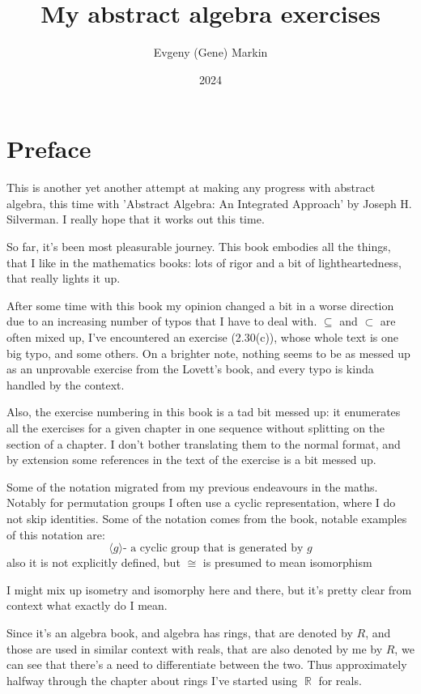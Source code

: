 \documentclass[11pt,oneside,titlepage]{book}
\title{My abstract algebra exercises}
\author{Evgeny (Gene) Markin}
\date{2024}
\DeclareMathOperator \real {\mathbb {R}}
\newcommand{\eangle}[1]{\langle #1 \rangle}
\begin{document}
\maketitle
\tableofcontents

\chapter*{Preface}

This is another yet another attempt at making any progress with
abstract algebra, this time with 'Abstract Algebra: An Integrated
Approach' by Joseph H. Silverman. I really hope that it works out this
time.

So far, it's been most pleasurable journey. This book embodies all the
things, that I like in the mathematics books: lots of rigor and a bit
of lightheartedness, that really lights it up.

After some time with this book my opinion changed a bit in a worse
direction due to an increasing number of typos that I have to deal
with. $\subseteq$ and $\subset$ are often mixed up, I've encountered
an exercise (2.30(c)), whose whole text is one big typo, and some
others. On a brighter note, nothing seems to be as messed up as an
unprovable exercise from the Lovett's book, and every typo is kinda
handled by the context.

Also, the exercise numbering in this book is a tad bit messed up: it
enumerates all the exercises for a given chapter in one sequence
without splitting on the section of a chapter. I don't bother
translating them to the normal format, and by extension some
references in the text of the exercise is a bit messed up.

Some of the notation migrated from my previous endeavours in the
maths. Notably for permutation groups I often use a cyclic
representation, where I do not skip identities.  Some of the notation
comes from the book, notable examples of this notation are:
$$\eangle{g} \text{- a cyclic group that is generated by }g$$
also it is not explicitly defined, but $\cong$ is presumed to mean
isomorphism

I might mix up isometry and isomorphy here and there, but it's pretty
clear from context what exactly do I mean.

Since it's an algebra book, and algebra has rings, that are denoted by
$R$, and those are used in similar context with reals, that are also
denoted by me by $R$, we can see that there's a need to differentiate
between the two. Thus approximately halfway through the chapter about
rings I've started using $\real$ for reals.
\end{document}
